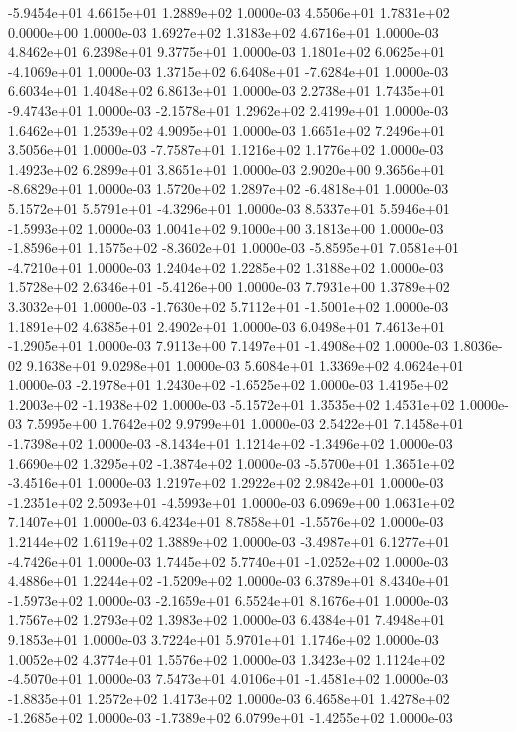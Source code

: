 -5.9454e+01  4.6615e+01  1.2889e+02  1.0000e-03
4.5506e+01 1.7831e+02 0.0000e+00  1.0000e-03
1.6927e+02 1.3183e+02 4.6716e+01  1.0000e-03
4.8462e+01 6.2398e+01 9.3775e+01  1.0000e-03
 1.1801e+02  6.0625e+01 -4.1069e+01  1.0000e-03
 1.3715e+02  6.6408e+01 -7.6284e+01  1.0000e-03
6.6034e+01 1.4048e+02 6.8613e+01  1.0000e-03
 2.2738e+01  1.7435e+01 -9.4743e+01  1.0000e-03
-2.1578e+01  1.2962e+02  2.4199e+01  1.0000e-03
1.6462e+01 1.2539e+02 4.9095e+01  1.0000e-03
1.6651e+02 7.2496e+01 3.5056e+01  1.0000e-03
-7.7587e+01  1.1216e+02  1.1776e+02  1.0000e-03
1.4923e+02 6.2899e+01 3.8651e+01  1.0000e-03
 2.9020e+00  9.3656e+01 -8.6829e+01  1.0000e-03
 1.5720e+02  1.2897e+02 -6.4818e+01  1.0000e-03
 5.1572e+01  5.5791e+01 -4.3296e+01  1.0000e-03
 8.5337e+01  5.5946e+01 -1.5993e+02  1.0000e-03
1.0041e+02 9.1000e+00 3.1813e+00  1.0000e-03
-1.8596e+01  1.1575e+02 -8.3602e+01  1.0000e-03
-5.8595e+01  7.0581e+01 -4.7210e+01  1.0000e-03
1.2404e+02 1.2285e+02 1.3188e+02  1.0000e-03
 1.5728e+02  2.6346e+01 -5.4126e+00  1.0000e-03
7.7931e+00 1.3789e+02 3.3032e+01  1.0000e-03
-1.7630e+02  5.7112e+01 -1.5001e+02  1.0000e-03
1.1891e+02 4.6385e+01 2.4902e+01  1.0000e-03
 6.0498e+01  7.4613e+01 -1.2905e+01  1.0000e-03
 7.9113e+00  7.1497e+01 -1.4908e+02  1.0000e-03
1.8036e-02 9.1638e+01 9.0298e+01  1.0000e-03
5.6084e+01 1.3369e+02 4.0624e+01  1.0000e-03
-2.1978e+01  1.2430e+02 -1.6525e+02  1.0000e-03
 1.4195e+02  1.2003e+02 -1.1938e+02  1.0000e-03
-5.1572e+01  1.3535e+02  1.4531e+02  1.0000e-03
7.5995e+00 1.7642e+02 9.9799e+01  1.0000e-03
 2.5422e+01  7.1458e+01 -1.7398e+02  1.0000e-03
-8.1434e+01  1.1214e+02 -1.3496e+02  1.0000e-03
 1.6690e+02  1.3295e+02 -1.3874e+02  1.0000e-03
-5.5700e+01  1.3651e+02 -3.4516e+01  1.0000e-03
1.2197e+02 1.2922e+02 2.9842e+01  1.0000e-03
-1.2351e+02  2.5093e+01 -4.5993e+01  1.0000e-03
6.0969e+00 1.0631e+02 7.1407e+01  1.0000e-03
 6.4234e+01  8.7858e+01 -1.5576e+02  1.0000e-03
1.2144e+02 1.6119e+02 1.3889e+02  1.0000e-03
-3.4987e+01  6.1277e+01 -4.7426e+01  1.0000e-03
 1.7445e+02  5.7740e+01 -1.0252e+02  1.0000e-03
 4.4886e+01  1.2244e+02 -1.5209e+02  1.0000e-03
 6.3789e+01  8.4340e+01 -1.5973e+02  1.0000e-03
-2.1659e+01  6.5524e+01  8.1676e+01  1.0000e-03
1.7567e+02 1.2793e+02 1.3983e+02  1.0000e-03
6.4384e+01 7.4948e+01 9.1853e+01  1.0000e-03
3.7224e+01 5.9701e+01 1.1746e+02  1.0000e-03
1.0052e+02 4.3774e+01 1.5576e+02  1.0000e-03
 1.3423e+02  1.1124e+02 -4.5070e+01  1.0000e-03
 7.5473e+01  4.0106e+01 -1.4581e+02  1.0000e-03
-1.8835e+01  1.2572e+02  1.4173e+02  1.0000e-03
 6.4658e+01  1.4278e+02 -1.2685e+02  1.0000e-03
-1.7389e+02  6.0799e+01 -1.4255e+02  1.0000e-03
